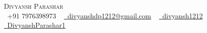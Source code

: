 \begin{center}
    {\Huge \scshape Divyansh Parashar} \\ \vspace{1pt}
    \small \raisebox{-0.1\height}\faPhone\ +91 7976398973 ~
    \href{mailto:divyanshdp1212@gmail.com}{\raisebox{-0.2\height}\faEnvelope\  \underline{divyanshdp1212@gmail.com}} ~
    \href{https://linkedin.com/in/divyansh1212/}{\raisebox{-0.2\height}\faLinkedin\ \underline{divyansh1212}} ~
    \href{https://github.com/DivyanshParashar1/}{\raisebox{-0.2\height}\faGithub\ \underline{DivyanshParashar1}}
    \vspace{-8pt}
\end{center}
